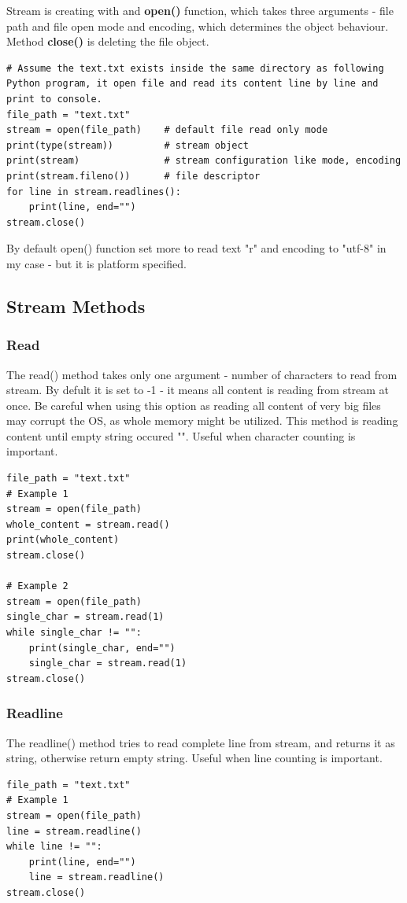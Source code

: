 \documentclass{article}
\begin{document}
Stream is creating with and \textbf{open()} function, which takes three arguments - file path and file open mode and encoding, which determines the object behaviour. Method \textbf{close()} is deleting the file object.
\begin{lstlisting}[style=pystyle]
# Assume the text.txt exists inside the same directory as following Python program, it open file and read its content line by line and print to console.
file_path = "text.txt"
stream = open(file_path)    # default file read only mode
print(type(stream))         # stream object
print(stream)               # stream configuration like mode, encoding
print(stream.fileno())      # file descriptor
for line in stream.readlines():
    print(line, end="")
stream.close()
\end{lstlisting} 
By default open() function set more to read text "r" and encoding to "utf-8" in my case - but it is platform specified.

\subsection{Stream Methods}
\subsubsection{Read} 

The read() method takes only one argument - number of characters to read from stream. By defult it is set to -1 - it means all content is reading from stream at once. Be careful when using this option as reading all content of very big files may corrupt the OS, as whole memory might be utilized. This method is reading content until empty string occured "". Useful when character counting is important.
\begin{lstlisting}[style=pystyle]
file_path = "text.txt"
# Example 1
stream = open(file_path)
whole_content = stream.read()
print(whole_content)
stream.close()

# Example 2
stream = open(file_path)
single_char = stream.read(1)
while single_char != "":
	print(single_char, end="")
	single_char = stream.read(1)
stream.close()
\end{lstlisting} 

\subsubsection{Readline}
The readline() method tries to read complete line from stream, and returns it as string, otherwise return empty string. Useful when line counting is important.
\begin{lstlisting}[style=pystyle]
file_path = "text.txt"
# Example 1
stream = open(file_path)
line = stream.readline()
while line != "":
	print(line, end="")
	line = stream.readline() 
stream.close()
\end{lstlisting}
\end{document}
